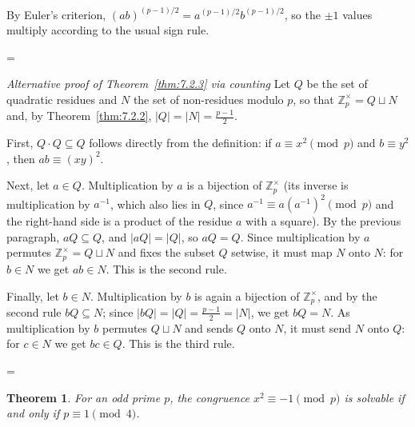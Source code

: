 \documentclass[11pt]{article}
\makeatletter
\theoremstyle{ntstyle}
\newtheorem{theorem}{Theorem}[subsection]
\let\nt@closedisplay\]
\def\nt@guardedclose{\@ifnextchar\par{\nt@closeafterpar}{\@ifnextchar\end{\postdisplaypenalty\@M\nt@closedisplay}{\nt@closedisplay}}}
\def\nt@closeafterpar\par{\@ifnextchar\par{\nt@closeafterpar}{\@ifnextchar\end{\postdisplaypenalty\@M\nt@closedisplay\par}{\nt@closedisplay\par}}}
\renewenvironment{proof}[1][\proofname]{\par
  \pushQED{\qed}\normalfont\topsep\medskipamount\edef\nt@afterproof{\@endparpenalty=\the\@endparpenalty\relax}\@beginparpenalty\@M\@endparpenalty\@M\let\]\nt@guardedclose\trivlist\item[]\textit{#1\@addpunct{.}} \ignorespaces}{\ifvmode\addpenalty\@M\fi\popQED\nt@afterproof\endtrivlist\@endpefalse}
\newenvironment{altproof}[1][\proofname]{\begin{proof}[#1]\renewcommand{\qedsymbol}{}}{\end{proof}}
\newcommand{\ZmodUnits}[1]{\mathbb{Z}_{#1}^{\times}}
\makeatother
\begin{document}
\begin{proof} By Euler's criterion, $(ab)^{(p-1)/2} =
		a^{(p-1)/2} b^{(p-1)/2}$, so the $\pm 1$ values multiply according to the usual sign rule.

\end{proof}
\begin{altproof}[Alternative proof of Theorem~\ref{thm:7.2.3} via counting] Let
	$Q$ be the set of quadratic residues and $N$ the set of non-residues
	modulo $p$, so that $\ZmodUnits{p} = Q \sqcup N$ and, by
	Theorem~\ref{thm:7.2.2}, $|Q| = |N| = \tfrac{p-1}{2}$.

	First, $Q \cdot Q \subseteq Q$ follows directly from the definition: if $a
		\equiv x^{2} \pmod{p}$ and $b \equiv y^{2}$, then $ab \equiv (xy)^{2}$.

	Next, let $a \in Q$. Multiplication by $a$ is a bijection of
	$\ZmodUnits{p}$ (its inverse is multiplication by $a^{-1}$,
	which also lies in $Q$, since $a^{-1} \equiv a(a^{-1})^{2} \pmod{p}$ and the right-hand side is a
		product of the residue $a$ with a square). By the previous paragraph,
	$aQ \subseteq Q$, and $|aQ| = |Q|$, so $aQ = Q$. Since multiplication
		by $a$ permutes $\ZmodUnits{p} = Q \sqcup N$ and fixes the
		subset $Q$ setwise, it must map $N$ onto $N$: for $b \in N$ we get $ab
	\in N$. This is the second rule.

		Finally, let $b \in N$. Multiplication by $b$ is again a bijection of
	$\ZmodUnits{p}$, and by the second rule $bQ \subseteq N$;
		since $|bQ| = |Q| = \tfrac{p-1}{2} = |N|$, we get $bQ = N$. As
		multiplication by $b$ permutes $Q \sqcup N$ and sends $Q$ onto $N$, it
		must send $N$ onto $Q$: for $c \in N$ we get $bc \in Q$. This is the
	third rule.

\end{altproof}
\begin{theorem}\label{thm:7.2.4} For an odd
	prime $p$, the congruence $x^{2} \equiv -1 \pmod{p}$ is solvable if and
	only if $p \equiv 1 \pmod{4}$.

\end{theorem}
\end{document}

